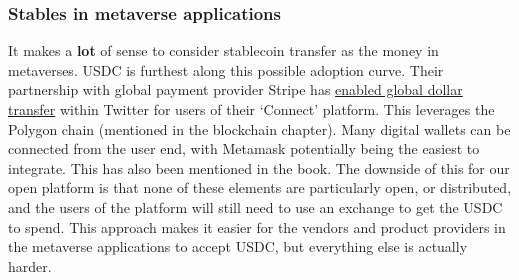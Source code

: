 \subsubsection{Stables in metaverse applications}
It makes a \textbf{lot} of sense to consider stablecoin transfer as the money in metaverses. USDC is furthest along this possible adoption curve. Their partnership with global payment provider Stripe has \href{https://stripe.com/blog/expanding-global-payouts-with-crypto}{enabled global dollar transfer} within Twitter for users of their `Connect' platform. This leverages the Polygon chain (mentioned in the blockchain chapter). Many digital wallets can be connected from the user end, with Metamask potentially being the easiest to integrate. This has also been mentioned in the book. The downside of this for our open platform is that none of these elements are particularly open, or distributed, and the users of the platform will still need to use an exchange to get the USDC to spend. This approach makes it easier for the vendors and product providers in the metaverse applications to accept USDC, but everything else is actually harder.


